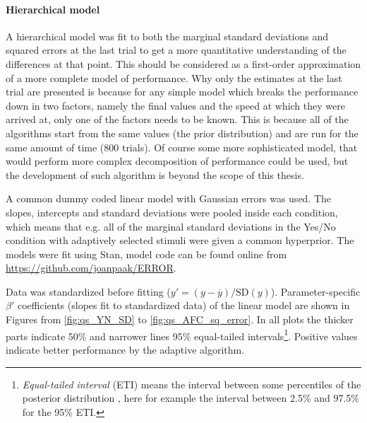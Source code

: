 \documentclass{article}\usepackage{knitr}
\begin{document}
\paragraph{Hierarchical model}

A hierarchical model was fit to both the marginal standard deviations and squared errors at the last trial to get a more quantitative understanding of the differences at that point. This should be considered as a first-order approximation of a more complete model of performance. Why only the estimates at the last trial are presented is because for any simple model which breaks the performance down in two factors, namely the final values and the speed at which they were arrived at, only one of the factors needs to be known. This is because all of the algorithms start from the same values (the prior distribution) and are run for the same amount of time (800 trials). Of course some more sophisticated model, that would perform more complex decomposition of performance could be used, but the development of such algorithm is beyond the scope of this thesis. 

A common dummy coded linear model with Gaussian errors was used. The slopes, intercepts and standard deviations were pooled inside each condition, which means that e.g. all of the marginal standard deviations in the Yes/No condition with adaptively selected stimuli were given a common hyperprior. The models were fit using Stan, model code can be found online from \url{https://github.com/joanpaak/ERROR}.

Data was standardized before fitting ($y' = (y - \overline{y}) / \text{SD}(y) $). Parameter-specific $\beta'$ coefficients (slopes fit to standardized data) of the linear model are shown in Figures from \ref{fig:qs_YN_SD} to \ref{fig:qs_AFC_sq_error}. In all plots the thicker parts indicate 50\% and narrower lines 95\% equal-tailed intervals\footnote{\textit{Equal-tailed interval} (ETI) means the interval between some percentiles of the posterior distribution \citep[p. 342]{kruschke2015}, here for example the interval between 2.5\% and 97.5\% for the 95\% ETI.}. Positive values indicate better performance by the adaptive algorithm.
\end{document}
